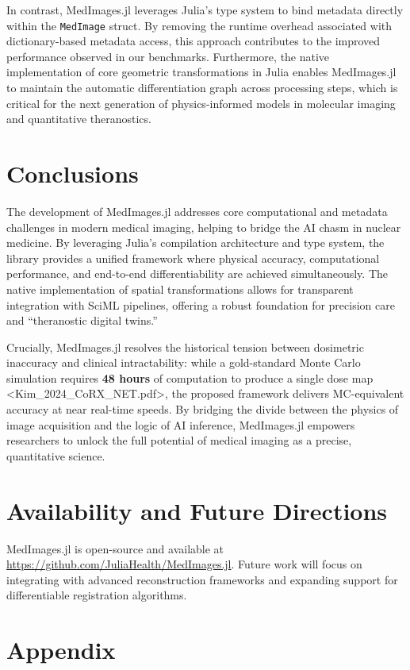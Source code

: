 \documentclass[10pt,letterpaper]{article}
\begin{document}
In contrast, MedImages.jl leverages Julia's type system to bind metadata directly within the \texttt{MedImage} struct. By removing the runtime overhead associated with dictionary-based metadata access, this approach contributes to the improved performance observed in our benchmarks. Furthermore, the native implementation of core geometric transformations in Julia enables MedImages.jl to maintain the automatic differentiation graph across processing steps, which is critical for the next generation of physics-informed models in molecular imaging and quantitative theranostics.

\section{Conclusions}
The development of MedImages.jl addresses core computational and metadata challenges in modern medical imaging, helping to bridge the AI chasm in nuclear medicine. By leveraging Julia's compilation architecture and type system, the library provides a unified framework where physical accuracy, computational performance, and end-to-end differentiability are achieved simultaneously. The native implementation of spatial transformations allows for transparent integration with SciML pipelines, offering a robust foundation for precision care and ``theranostic digital twins.'' 

Crucially, MedImages.jl resolves the historical tension between dosimetric inaccuracy and clinical intractability: while a gold-standard Monte Carlo simulation requires \textbf{48 hours} of computation to produce a single dose map <Kim_2024_CoRX_NET.pdf>, the proposed framework delivers MC-equivalent accuracy at near real-time speeds. By bridging the divide between the physics of image acquisition and the logic of AI inference, MedImages.jl empowers researchers to unlock the full potential of medical imaging as a precise, quantitative science.

\section*{Availability and Future Directions}
MedImages.jl is open-source and available at \url{https://github.com/JuliaHealth/MedImages.jl}. Future work will focus on integrating with advanced reconstruction frameworks and expanding support for differentiable registration algorithms.

\section{Appendix}
\end{document}
